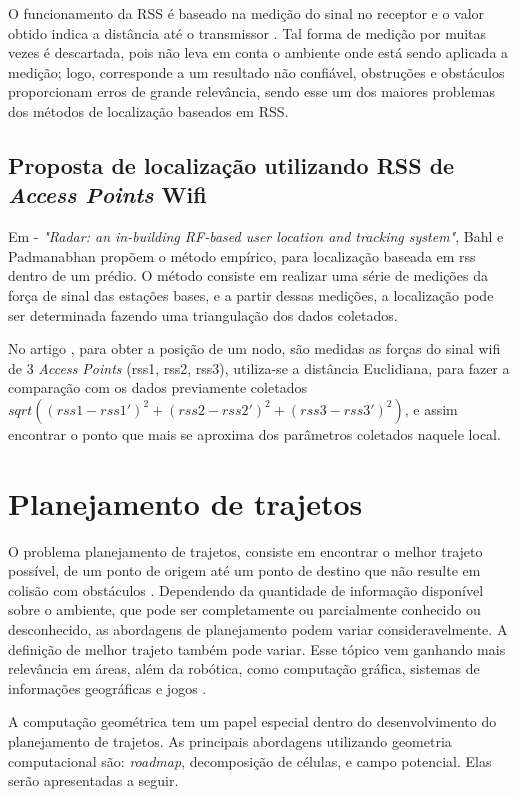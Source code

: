 \documentclass[12pt]{article}
\begin{document}
  O funcionamento da RSS é baseado na medição do sinal no receptor e o valor
obtido indica a distância até o transmissor \cite{rss1}. Tal forma de medição por muitas vezes é
descartada, pois não leva em conta o ambiente onde está sendo aplicada a medição; logo,
corresponde a um resultado não confiável, obstruções e obstáculos proporcionam erros de grande relevância, 
sendo esse um dos maiores problemas dos métodos de localização baseados em RSS\cite{wifiRadar}. 

\subsection{Proposta de localização utilizando RSS de \textit{Access Points} Wifi}	

   Em \cite{wifiRadar} - \textit{"Radar: an in-building RF-based user location and tracking system"}, Bahl e Padmanabhan propõem o método empírico,
   para localização baseada em rss dentro de um prédio. O método consiste em realizar uma série de medições da força de sinal das estações bases, e a partir dessas medições, 
   a localização pode ser determinada fazendo uma triangulação dos dados coletados. 

  No artigo \cite{wifiRadar}, para obter a posição de um nodo, são medidas as forças do sinal wifi de 3 \textit{Access Points} (rss1, rss2, rss3), 
utiliza-se a distância Euclidiana, para fazer a comparação com os dados previamente coletados $sqrt((rss1-rss1')^{2}+(rss2-rss2')^{2}+(rss3-rss3')^{2})$, 
e assim encontrar o ponto que mais se aproxima dos parâmetros coletados naquele local. 

\clearpage
\section{Planejamento de trajetos}
  O problema planejamento de trajetos, consiste em encontrar o melhor trajeto possível, 
  de um ponto de origem até um ponto de destino que não resulte em colisão com obstáculos \cite{voronoi}.
  Dependendo da quantidade de informação disponível sobre o ambiente, que pode ser completamente ou
   parcialmente conhecido ou desconhecido, as abordagens de planejamento podem variar consideravelmente.
   A definição de melhor trajeto também pode variar. Esse tópico vem ganhando mais relevância em áreas, além da robótica, como computação gráfica, sistemas de informações 
  geográficas e jogos \cite{planejamentoCaminhos}.
  
  A computação geométrica tem um papel especial dentro do desenvolvimento do planejamento de trajetos.
  As principais abordagens utilizando geometria computacional são: \textit{roadmap}, decomposição de células,
 e campo potencial. Elas serão apresentadas a seguir.
\end{document}
